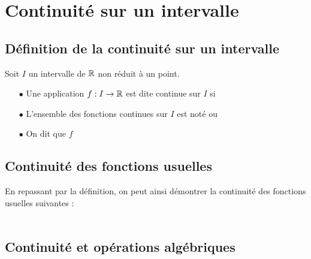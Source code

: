 \documentclass[a4paper, 11pt]{article}
\begin{document}
\section{Continuit\'e sur un intervalle}
\subsection{D\'efinition de la continuit\'e sur un intervalle}


\begin{defi}
	Soit $I$ un intervalle de $\mathbb{R}$ non r\'eduit \`a un point. \vsec
	\begin{itemize}
		\item[$\bullet$] Une application $f: I\rightarrow \mathbb{R}$ est dite continue sur $I$ si \dotfill\vsec
		\item[$\bullet$] L'ensemble des fonctions continues sur $I$ est not\'e \dotfill ou \dotfill\vsec
		\item[$\bullet$] On dit que $f$ \dotfill\vsec
	\end{itemize}
\end{defi}



\subsection{Continuit\'e des fonctions usuelles}

\noindent En repassant par la d\'efinition, on peut ainsi d\'emontrer la continuit\'e des fonctions usuelles suivantes :\vsec\\
\phantom{\hspace*{0cm}}\dotfill\vsec\\
\phantom{\hspace*{0cm}}\dotfill


\subsection{Continuit\'e et op\'erations alg\'ebriques}
\end{document}
